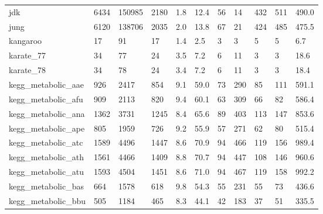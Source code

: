 \begin{longtable}{lllllllllll}
 jdk                                                & 6434       & 150985    & 2180  & 1.8    & 12.4   & 56    & 14     & 432    & 511    & 490.0   \\
 jung                                               & 6120       & 138706    & 2035  & 2.0    & 13.8   & 67    & 21     & 424    & 485    & 475.5   \\
 kangaroo                                           & 17         & 91        & 17    & 1.4    & 2.5    & 3     & 3      & 5      & 5      & 6.7     \\
 karate\_77                                          & 34         & 77        & 24    & 3.5    & 7.2    & 6     & 11     & 3      & 3      & 18.6    \\
 karate\_78                                          & 34         & 78        & 24    & 3.4    & 7.2    & 6     & 11     & 3      & 3      & 18.4    \\
 kegg\_metabolic\_aae                                 & 926        & 2417      & 854   & 9.1    & 59.0   & 73    & 290    & 85     & 111    & 591.1   \\
 kegg\_metabolic\_afu                                 & 909        & 2113      & 820   & 9.4    & 60.1   & 63    & 309    & 66     & 82     & 586.4   \\
 kegg\_metabolic\_ana                                 & 1362       & 3731      & 1245  & 8.4    & 65.6   & 89    & 403    & 113    & 147    & 853.6   \\
 kegg\_metabolic\_ape                                 & 805        & 1959      & 726   & 9.2    & 55.9   & 57    & 271    & 62     & 80     & 515.4   \\
 kegg\_metabolic\_atc                                 & 1589       & 4496      & 1447  & 8.6    & 70.9   & 94    & 466    & 119    & 156    & 989.4   \\
 kegg\_metabolic\_ath                                 & 1561       & 4466      & 1409  & 8.8    & 70.7   & 94    & 447    & 108    & 146    & 960.6   \\
 kegg\_metabolic\_atu                                 & 1593       & 4504      & 1451  & 8.6    & 71.0   & 94    & 467    & 119    & 158    & 992.2   \\
 kegg\_metabolic\_bas                                 & 664        & 1578      & 618   & 9.8    & 54.3   & 55    & 231    & 55     & 73     & 436.6   \\
 kegg\_metabolic\_bbu                                 & 505        & 1184      & 465   & 8.3    & 44.1   & 42    & 183    & 37     & 51     & 335.5   \\

\end{longtable}
